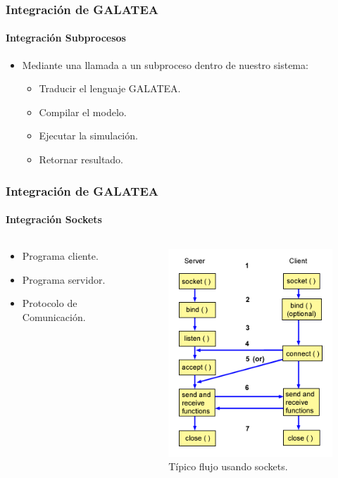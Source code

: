\documentclass[spanish,xcolor=dvipsnames]{beamer}
\begin{document}
    \begin{frame}
    	\frametitle{Integración de GALATEA}
    	\framesubtitle{Integración Subprocesos}
    	
    	\begin{itemize}
    		\item Mediante una llamada a un subproceso dentro de nuestro sistema:
    		\begin{itemize}
    			\item Traducir el lenguaje GALATEA.
    			\item Compilar el modelo.
    			\item Ejecutar la simulación.
    			\item Retornar resultado.
    		\end{itemize}
    	\end{itemize}
    \end{frame}
    \begin{frame}
    	\frametitle{Integración de GALATEA}
    	\framesubtitle{Integración Sockets}
    	
    	\begin{columns}
    		\begin{column}{.4\linewidth}
    			\begin{itemize}
    				\item Programa cliente.
    				\item Programa servidor.
    				\item Protocolo de Comunicación.
    			\end{itemize}
    		\end{column}
    		\begin{column}{.6\linewidth}
    			\begin{figure}[H]
    				\centering
    				\includegraphics[scale=0.4]{img/socketWork.png}
    				\caption{Típico flujo usando sockets.}
    				\label{socketWork}
    			\end{figure}
    		\end{column}
    	\end{columns}
    \end{frame}
    
\end{document}
